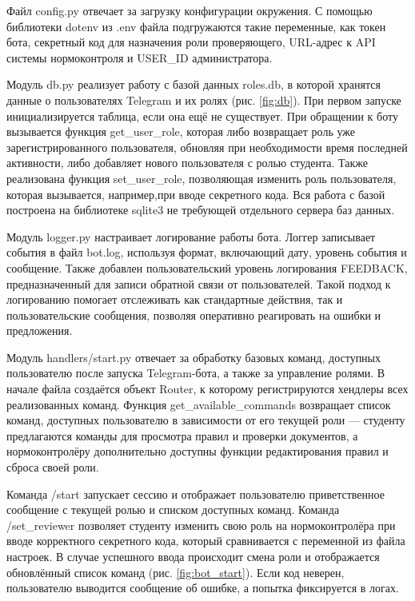 \documentclass{report}
\begin{document}
Файл config.py отвечает за загрузку конфигурации окружения. С помощью библиотеки dotenv из .env файла подгружаются такие переменные, как токен бота, секретный код для назначения роли проверяющего, URL-адрес к API системы нормоконтроля и USER\_ID администратора.

Модуль db.py реализует работу с базой данных roles.db, в которой хранятся данные о пользователях Telegram и их ролях (рис. \ref{fig:db}). При первом запуске инициализируется таблица, если она ещё не существует. При обращении к боту вызывается функция get\_user\_role, которая либо возвращает роль уже зарегистрированного пользователя, обновляя при необходимости время последней активности, либо добавляет нового пользователя с ролью студента. Также реализована функция set\_user\_role, позволяющая изменить роль пользователя, которая вызывается, например,при вводе секретного кода. Вся работа с базой построена на библиотеке sqlite3 не требующей отдельного сервера баз данных.


Модуль logger.py настраивает логирование работы бота. Логгер записывает события в файл bot.log, используя формат, включающий дату, уровень события и сообщение. Также добавлен пользовательский уровень логирования FEEDBACK, предназначенный для записи обратной связи от пользователей. Такой подход к логированию помогает отслеживать как стандартные действия, так и пользовательские сообщения, позволяя оперативно реагировать на ошибки и предложения.


Модуль handlers/start.py отвечает за обработку базовых команд, доступных пользователю после запуска Telegram-бота, а также за управление ролями. В начале файла создаётся объект Router, к которому регистрируются хендлеры всех реализованных команд. Функция get\_available\_commands возвращает список команд, доступных пользователю в зависимости от его текущей роли — студенту предлагаются команды для просмотра правил и проверки документов, а нормоконтролёру дополнительно доступны функции редактирования правил и сброса своей роли.

Команда /start запускает сессию и отображает пользователю приветственное сообщение с текущей ролью и списком доступных команд. Команда /set\_reviewer позволяет студенту изменить свою роль на нормоконтролёра при вводе корректного секретного кода, который сравнивается с переменной из файла настроек. В случае успешного ввода происходит смена роли и отображается обновлённый список команд (рис. \ref{fig:bot_start}). Если код неверен, пользователю выводится сообщение об ошибке, а попытка фиксируется в логах.
\end{document}
